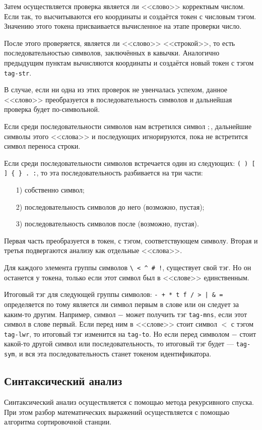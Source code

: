     Затем осуществляется проверка является ли <<слово>> корректным числом.
    Если так, то высчитываются его координаты и создаётся токен с числовым тэгом.
    Значению этого токена присваивается вычисленное на этапе проверки число.

    После этого проверяется, является ли <<слово>> <<строкой>>, то есть последовательностью символов, заключённых в кавычки.
    Аналогично предыдущим пунктам вычисляются координаты и создаётся новый токен с тэгом \verb$tag-str$.

    В случае, если ни одна из этих проверок не увенчалась успехом, данное <<слово>> преобразуется в последовательность символов и дальнейшая проверка будет по-символьной.

    Если среди последовательности символов нам встретился символ $;$, дальнейшие символы этого <<слова>> и последующих игнорируются, пока не встретится символ переноса строки.

    Если среди последовательности символов встречается один из следующих: \verb!( ) [ ] { } . :!, то эта последовательность разбивается на три части:
    \begin{enumerate}
        \item[1)] собственно символ;
        \item[2)] последовательность символов до него (возможно, пустая);
        \item[3)] последовательность символов после (возможно, пустая).
    \end{enumerate}
    Первая часть преобразуется в токен, с тэгом, соответствующем символу.
    Вторая и третья подвергаются анализу как отдельные <<слова>>.

    Для каждого элемента группы символов \verb,\ < ^ # !,, существует свой тэг.
    Но он останется у токена, только если этот символ был в <<слове>> единственным.

    Итоговый тэг для следующей группы символов: \verb!- + * t f / > | & =! определяется по тому является ли символ первым в слове или он следует за каким-то другим.
    Например, символ $-$ может получить тэг \verb$tag-mns$, если этот символ в слове первый.
    Если перед ним в <<слове>> стоит символ $<$ с тэгом \verb$tag-lwr$, то итоговый тэг изменится на \verb$tag-to$.
    Но если перед символом $-$ стоит какой-то другой символ или последовательность, то итоговый тэг будет --- \verb$tag-sym$, и вся эта последовательность станет токеном идентификатора.
    
    \subsection{Синтаксический анализ}
    Синтаксический анализ осуществляется с помощью метода рекурсивного спуска.
    При этом разбор математических выражений осуществляется с помощью алгоритма сортировочной станции.
